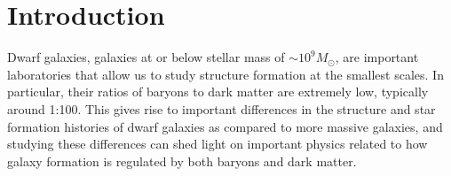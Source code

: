 \documentclass[iop]{emulateapj}
\begin{document}




\section{Introduction}
\label{intro}

Dwarf galaxies, galaxies at or below stellar mass of $\sim 10^{9} M_{\odot}$, are important laboratories that allow us to study structure formation at the smallest scales. In particular, their ratios of baryons to dark matter are extremely low, typically around 1:100. This gives rise to important differences in the structure and star formation histories of dwarf galaxies as compared to more massive galaxies, and studying these differences can shed light on important physics related to how galaxy formation is regulated by both baryons and dark matter.
\end{document}
